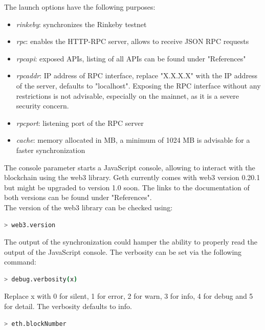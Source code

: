 The launch options have the following purposes\cite{cli-options}:
\begin{itemize}
    \item \textit{rinkeby}: synchronizes the Rinkeby testnet
    \item \textit{rpc}: enables the HTTP-RPC server, allows to receive JSON RPC requests
    \item \textit{rpcapi}: exposed APIs, listing of all APIs can be found under "References"\cite{json-rpc}\cite{management-apis}
    \item \textit{rpcaddr}: IP address of RPC interface, replace "X.X.X.X" with the IP address of the server, defaults to "localhost".
    Exposing the RPC interface without any restrictions is not advisable, especially on the mainnet, as it is a severe security concern.
    \item \textit{rpcport}: listening port of the RPC server
    \item \textit{cache}: memory allocated in MB, a minimum of 1024 MB is advisable for a faster synchronization
\end{itemize}
The console parameter starts a JavaScript console, allowing to interact with the blockchain using the web3 library.
Geth currently comes with web3 version 0.20.1\cite{javascript-0.20} but might be upgraded to version 1.0\cite{javascript-1.0} soon.
The links to the documentation of both versions can be found under "References".
\\
The version of the web3 library can be checked using:

\begin{lstlisting}[language=bash, numbers=none]
  > web3.version
\end{lstlisting}

The output of the synchronization could hamper the ability to properly read the output of the JavaScript console.
The verbosity can be set via the following command:

\begin{lstlisting}[language=bash, numbers=none]
  > debug.verbosity(x)
\end{lstlisting}

Replace x with 0 for silent, 1 for error, 2 for warn, 3 for info, 4 for debug and 5 for detail.
The verbosity defaults to info\cite{cli-options}.
\newpage

\begin{lstlisting}[language=bash, numbers=none]
  > eth.blockNumber
\end{lstlisting}

